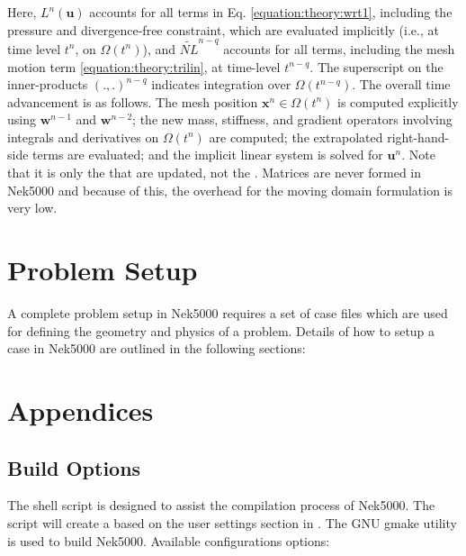 \documentclass[letterpaper,10pt,english]{sphinxmanual}
\begin{document}
Here, \(L^n(\mathbf u)\) accounts for all  terms in Eq. \eqref{equation:theory:wrt1}, including the
pressure and divergence-free constraint, which are evaluated implicitly (i.e., at time level
\(t^n\), on \(\Omega(t^n)\)), and \(\widetilde{N\!L}^{n-q}\) accounts for all
 terms, including the mesh motion term \eqref{equation:theory:trilin}, at time-level \(t^{n-q}\).
The superscript on the inner-products \((.,.)^{n-q}\) indicates integration over
\(\Omega(t^{n-q})\).  The overall time advancement is as follows.  The mesh position
\(\mathbf x^n \in \Omega(t^n)\) is computed explicitly using \(\mathbf w^{n-1}\) and
\(\mathbf w^{n-2}\); the new mass, stiffness, and gradient operators involving integrals and
derivatives on \(\Omega(t^n)\) are computed;  the extrapolated right-hand-side terms are
evaluated; and the implicit linear system is solved for \(\mathbf u^n\).   Note that it is only
the  that are updated, not the .  Matrices are never formed in Nek5000
and because of this, the overhead for the moving domain formulation is very low.


\section{Problem Setup}
\label{\detokenize{examples:id1}}\label{\detokenize{examples:problem-setup}}\label{\detokenize{examples::doc}}
A complete problem setup in Nek5000 requires a set of case files which are used for defining the geometry and physics of a problem.
Details of how to setup a case in Nek5000 are outlined in the following sections:


\section{Appendices}
\label{\detokenize{appendix::doc}}\label{\detokenize{appendix:appendices}}

\subsection{Build Options}
\label{\detokenize{appendix:build-options}}
The shell script  is designed to assist the compilation process of Nek5000. The script will create a  based on the user settings section in . The GNU gmake utility is used to build Nek5000.
Available configurations options:
\end{document}

